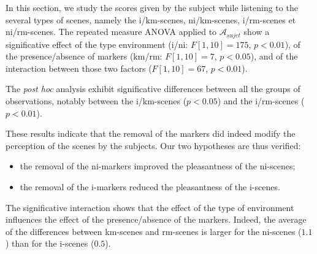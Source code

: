 \documentclass[twoside,twocolumn]{article}
\begin{document}
In this section, we study the scores given by the subject while listening to the several types of scenes, namely the i/km-scenes, ni/km-scenes, i/rm-scenes et ni/rm-scenes. The repeated measure ANOVA applied to $\mathcal{A}_{sujet}$ show a significative effect of the type environment (i/ni: $F[1,10]=175$, $p<0.01$), of the presence/absence of markers (km/rm: $F[1,10]=7$, $p<0.05$), and of the interaction between those two factors ($F[1,10]=67$, $p<0.01$).


The \emph{post hoc} analysis exhibit significative differences between all the groups of observations, notably between the i/km-scenes ($p<0.05$) and the i/rm-scenes ($p<0.01$).


These results indicate that the removal of the markers did indeed modify the perception of the scenes by the subjects. Our two hypotheses are thus verified:


\begin{itemize}
\item the removal of the ni-markers improved the pleasantness of the ni-scenes;
\item the removal of the i-markers reduced the pleasantness of the i-scenes.
\end{itemize}


The significative interaction shows that the effect of the type of environment influences the effect of the presence/absence of the markers. Indeed, the average of the differences between km-scenes and rm-scenes is larger for the ni-scenes ($1.1$) than for the i-scenes ($0.5$).
\end{document}
